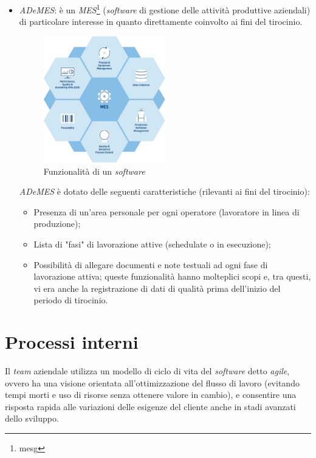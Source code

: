 \begin{itemize}
    \item \textit{ADeMES}: è un \textit{MES}\footnote{\gls{mesg}} (\textit{software} di gestione delle attività produttive aziendali) di particolare interesse in quanto direttamente coinvolto ai fini del tirocinio.
    \begin{figure}[H]
        \centering
        \includegraphics[width=0.5\textwidth]{images/mes.png}
        \caption[Funzionalità di un \textit{software MES}]{Funzionalità di un \textit{software } \footnotemark}
    \end{figure}

    \textit{ADeMES} è dotato delle seguenti caratteristiche (rilevanti ai fini del tirocinio):
    \begin{itemize}
        \item Presenza di un'area personale per ogni operatore (lavoratore in linea di produzione);
        \item Lista di "fasi" di lavorazione attive (schedulate o in esecuzione);
        \item Possibilità di allegare documenti e note testuali ad ogni fase di lavorazione attiva; queste funzionalità hanno molteplici scopi e, tra questi, vi era anche la registrazione di dati di qualità prima dell'inizio del periodo di tirocinio.
    \end{itemize}
\end{itemize}

\section{Processi interni}

Il \textit{team} aziendale utilizza un modello di ciclo di vita del \textit{software} detto \textit{agile}, ovvero ha una visione orientata all'ottimizzazione del flusso di lavoro (evitando tempi morti e uso di risorse senza ottenere valore in cambio), 
e consentire una risposta rapida alle variazioni delle esigenze del cliente anche in stadi avanzati dello sviluppo.

